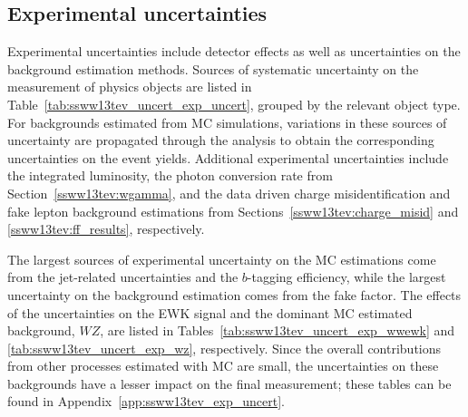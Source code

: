 \subsection{Experimental uncertainties}\label{ssww13tev:experimental_uncert}
Experimental uncertainties include detector effects as well as uncertainties on the background estimation methods.
Sources of systematic uncertainty on the measurement of physics objects are listed in Table~\ref{tab:ssww13tev_uncert_exp_uncert}, grouped by the relevant object type.
For backgrounds estimated from MC simulations, variations in these sources of uncertainty are propagated through the analysis to obtain the corresponding uncertainties on the event yields.
Additional experimental uncertainties include the integrated luminosity, the photon conversion rate from Section~\ref{ssww13tev:wgamma}, and the data driven charge misidentification and fake lepton background estimations from Sections~\ref{ssww13tev:charge_misid} and \ref{ssww13tev:ff_results}, respectively.

The largest sources of experimental uncertainty on the MC estimations come from the jet-related uncertainties and the $b$-tagging efficiency, while the largest uncertainty on the background estimation comes from the fake factor.
The effects of the uncertainties on the \ssww EWK signal and the dominant MC estimated background, $WZ$, are listed in Tables~\ref{tab:ssww13tev_uncert_exp_wwewk} and \ref{tab:ssww13tev_uncert_exp_wz}, respectively.
Since the overall contributions from other processes estimated with MC are small, the uncertainties on these backgrounds have a lesser impact on the final measurement; these tables can be found in Appendix~\ref{app:ssww13tev_exp_uncert}.

